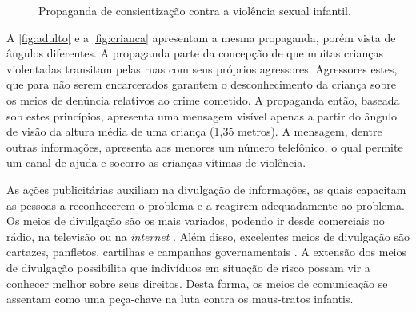 \begin{figure}[htb]%
  \centering
  \caption{\label{fig:ad}Propaganda de consientização contra a violência sexual infantil.}%
  \hspace{0.01cm}
  \vspace{10pt}
  \label{fig:example}%
\end{figure}

A \autoref{fig:adulto} e a \autoref{fig:crianca} apresentam a mesma propaganda, porém vista de ângulos diferentes. A propaganda parte da concepção de que muitas crianças violentadas transitam pelas ruas com seus próprios agressores. Agressores estes, que para não serem encarcerados garantem o desconhecimento da criança sobre os meios de denúncia relativos ao crime cometido. A propaganda então, baseada sob estes princípios, apresenta uma mensagem visível apenas a partir do ângulo de visão da altura média de uma criança (1,35 metros). A mensagem, dentre outras informações, apresenta aos menores um número telefônico, o qual permite um canal de ajuda e socorro as crianças vítimas de violência. 

As ações publicitárias auxiliam na divulgação de informações, as quais capacitam as pessoas a reconhecerem o problema e a reagirem adequadamente ao problema. Os meios de divulgação são os mais variados, podendo ir desde comerciais no rádio, na televisão ou na \textit{internet} \cite{martinez2000prevencion}. Além disso, excelentes meios de divulgação são cartazes, panfletos, cartilhas e campanhas governamentais \cite{mendelson2015parent}. A extensão dos meios de divulgação possibilita que indivíduos em situação de risco possam vir a conhecer melhor sobre seus direitos. Desta forma, os meios de comunicação se assentam como uma peça-chave na luta contra os maus-tratos infantis. 

